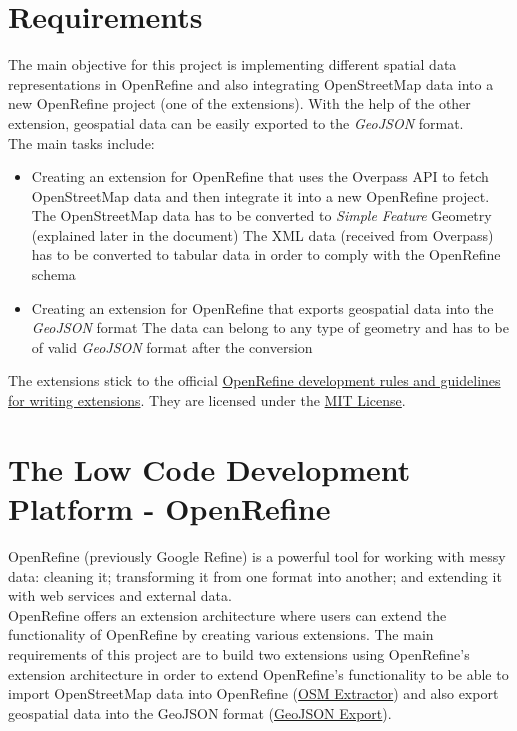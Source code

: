 \section{Requirements}
The main objective for this project is implementing different spatial data representations in OpenRefine and also integrating OpenStreetMap data into
a new OpenRefine project (one of the extensions).
With the help of the other extension, geospatial data can be easily exported to the \textit{GeoJSON} format.\\
\newline
The main tasks include:
\begin{itemize}
   \item Creating an extension for OpenRefine that uses the Overpass API to fetch OpenStreetMap data and then integrate it into a new OpenRefine project.
    \subitem The OpenStreetMap data has to be converted to \textit{Simple Feature} Geometry (explained later in the document)
    \subitem The XML data (received from Overpass) has to be converted to tabular data in order to comply with the OpenRefine schema
   \item Creating an extension for OpenRefine that exports geospatial data into the \textit{GeoJSON} format
    \subitem  The data can belong to any type of geometry and has to be of valid \textit{GeoJSON} format after the conversion
\end{itemize}
The extensions stick to the official \href{https://docs.openrefine.org/technical-reference/writing-extensions}{OpenRefine development rules and guidelines for writing extensions}. They are licensed
under the \href{https://opensource.org/licenses/MIT}{MIT License}.
\pagebreak
\section{The Low Code Development Platform - OpenRefine}
OpenRefine (previously Google Refine) is a powerful tool for working with messy data: cleaning it; transforming it from one format into another; and extending it with web services and external data.~\cite{AboutOpenRefine}\\
\newline
OpenRefine offers an extension architecture where users can extend the functionality of OpenRefine by creating various extensions.
The main requirements of this project are to build two extensions using OpenRefine's extension architecture in order to extend OpenRefine's functionality to
be able to import OpenStreetMap data into OpenRefine (\hyperref[ch:the-osm-extractor-extension]{OSM Extractor}) and also export geospatial
data into the GeoJSON format (\hyperref[ch:the-geojson-export-extension]{GeoJSON Export}).


